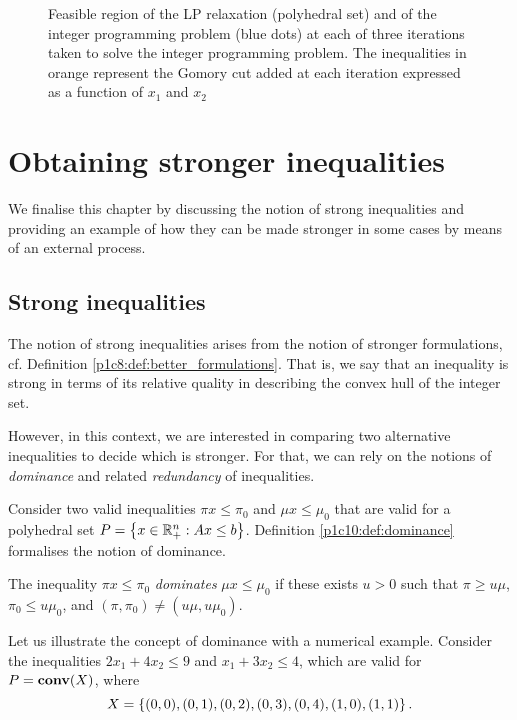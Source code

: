 \begin{figure}[h]
      \caption{Feasible region of the LP relaxation (polyhedral set) and of the integer programming problem (blue dots) at each of three iterations taken to solve the integer programming problem. The inequalities in orange represent the Gomory cut added at each iteration expressed as a function of $x_1$ and $x_2$} \label{p1c10:fig:LP_1}	
\end{figure}


\section{Obtaining stronger inequalities}

We finalise this chapter by discussing the notion of strong inequalities and providing an example of how they can be made stronger in some cases by means of an external process. 


\subsection{Strong inequalities}

The notion of strong inequalities arises from the notion of stronger formulations, cf. Definition \ref{p1c8:def:better_formulations}. That is, we say that an inequality is strong in terms of its relative quality in describing the convex hull of the integer set.

However, in this context, we are interested in comparing two alternative inequalities to decide which is stronger. For that, we can rely on the notions of \emph{dominance} and related \emph{redundancy} of inequalities. 

Consider two valid inequalities $\pi x \leq \pi_0$ and $\mu x \leq \mu_0$ that are valid for a polyhedral set $P = \left\{ x \in \mathbb{R}^n_+ : Ax \leq b \right \}$. Definition \ref{p1c10:def:dominance} formalises the notion of dominance.

\begin{definition}[Dominance] \label{p1c10:def:dominance}
    The inequality $\pi x \leq \pi_0$ \emph{dominates} $\mu x \leq \mu_0$ if these exists $u > 0$ such that $\pi \geq u\mu$, $\pi_0 \leq u\mu_0$, and $(\pi, \pi_0) \neq (u\mu, u\mu_0)$.
\end{definition}

Let us illustrate the concept of dominance with a numerical example. Consider the inequalities $2x_1 + 4x_2 \leq 9$ and $x_1 + 3x_2 \leq 4$, which are valid for $P = \mathop{\bf conv}(X)$, where 
	\begin{equation*}
	X = \left\{ (0,0), (0,1), (0,2), (0,3), (0,4), (1,0), (1,1) \right \}.	
	\end{equation*}
	
